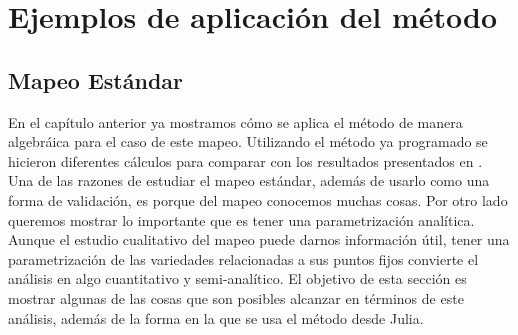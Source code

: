 
\chapter{Ejemplos de aplicación del método}
\section{Mapeo Estándar}
En el capítulo anterior ya mostramos cómo se aplica el método de manera algebráica para el caso de este mapeo. Utilizando el método ya programado se hicieron diferentes cálculos para comparar con los resultados presentados en \citep{Mireles}. Una de las razones de estudiar el mapeo estándar, además de usarlo como una forma de validación, es porque del mapeo conocemos muchas cosas. Por otro lado queremos mostrar lo importante que es tener una parametrización analítica. Aunque el estudio cualitativo del mapeo puede darnos información útil, tener una parametrización de las variedades relacionadas a sus puntos fijos convierte el análisis en algo cuantitativo y semi-analítico. El objetivo de esta sección es mostrar algunas de las cosas que son posibles alcanzar en términos de este análisis, además de la forma en la que se usa el método desde Julia.\\

